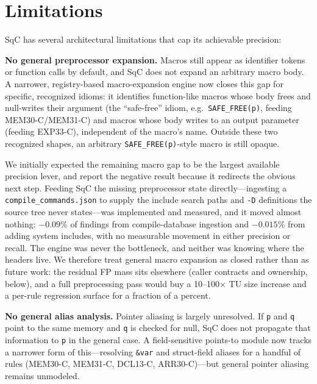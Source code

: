 \section{Limitations}
\label{sec:limitations}

SqC has several architectural limitations that cap its achievable
precision:

\textbf{No general preprocessor expansion.}  Macros still appear as
identifier tokens or function calls by default, and SqC does not
expand an arbitrary macro body.  A narrower, registry-based
macro-expansion engine now closes this gap for specific, recognized
idioms: it identifies function-like macros whose body frees and
null-writes their argument (the ``safe-free'' idiom, e.g.\
\texttt{SAFE\_FREE(p)}, feeding MEM30-C/MEM31-C) and macros whose body
writes to an output parameter (feeding EXP33-C), independent of the
macro's name.  Outside these two recognized shapes, an arbitrary
\texttt{SAFE\_FREE(p)}-style macro is still opaque.

We initially expected the remaining macro gap to be the largest
available precision lever, and report the negative result because it
redirects the obvious next step.  Feeding SqC the missing preprocessor
state directly---ingesting a \texttt{compile\_commands.json} to supply
the include search paths and \texttt{-D} definitions the source tree
never states---was implemented and measured, and it moved almost
nothing: $-0.09\%$ of findings from compile-database ingestion and
$-0.015\%$ from adding system includes, with no measurable movement in
either precision or recall.  The engine was never the bottleneck, and
neither was knowing where the headers live.  We therefore treat
general macro expansion as closed rather than as future work: the
residual FP mass sits elsewhere (caller contracts and ownership,
below), and a full preprocessing pass would buy a 10--100$\times$ TU
size increase and a per-rule regression surface for a fraction of a
percent.

\textbf{No general alias analysis.}  Pointer aliasing is largely
unresolved.  If \texttt{p} and \texttt{q} point to the same memory and
\texttt{q} is checked for null, SqC does not propagate that
information to \texttt{p} in the general case.  A field-sensitive
points-to module now tracks a narrower form of this---resolving
\texttt{\&var} and struct-field aliases for a handful of rules
(MEM30-C, MEM31-C, DCL13-C, ARR30-C)---but general pointer aliasing
remains unmodeled.

